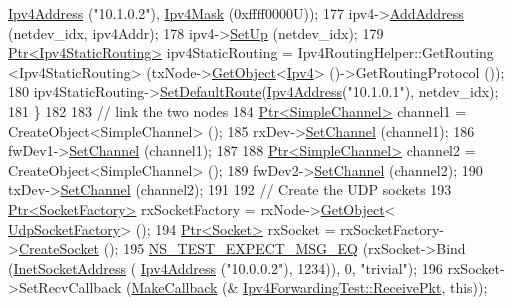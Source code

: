 \begin{DoxyCode}
      \hyperlink{classns3_1_1Ipv4Address}{Ipv4Address} (\textcolor{stringliteral}{"10.1.0.2"}), \hyperlink{classns3_1_1Ipv4Mask}{Ipv4Mask} (0xffff0000U));
177     ipv4->\hyperlink{classns3_1_1Ipv4_ad203526cae6a4b86f1bb89e44d2b62f7}{AddAddress} (netdev\_idx, ipv4Addr);
178     ipv4->\hyperlink{classns3_1_1Ipv4_a71b2f8acca4923aef907b50b3196bf23}{SetUp} (netdev\_idx);
179     \hyperlink{classns3_1_1Ptr}{Ptr<Ipv4StaticRouting>} ipv4StaticRouting = Ipv4RoutingHelper::GetRouting
       <Ipv4StaticRouting> (txNode->\hyperlink{classns3_1_1Object_a13e18c00017096c8381eb651d5bd0783}{GetObject}<\hyperlink{classns3_1_1Ipv4}{Ipv4}> ()->GetRoutingProtocol ());
180     ipv4StaticRouting->\hyperlink{classns3_1_1Ipv4StaticRouting_aee30fa3246c2b42f122dabdff2725331}{SetDefaultRoute}(\hyperlink{classns3_1_1Ipv4Address}{Ipv4Address}(\textcolor{stringliteral}{"10.1.0.1"}), netdev\_idx);
181   \}
182 
183   \textcolor{comment}{// link the two nodes}
184   \hyperlink{classns3_1_1Ptr}{Ptr<SimpleChannel>} channel1 = CreateObject<SimpleChannel> ();
185   rxDev->\hyperlink{classns3_1_1SimpleNetDevice_af9e9828ad584b5ba538f18f645f162e0}{SetChannel} (channel1);
186   fwDev1->\hyperlink{classns3_1_1SimpleNetDevice_af9e9828ad584b5ba538f18f645f162e0}{SetChannel} (channel1);
187 
188   \hyperlink{classns3_1_1Ptr}{Ptr<SimpleChannel>} channel2 = CreateObject<SimpleChannel> ();
189   fwDev2->\hyperlink{classns3_1_1SimpleNetDevice_af9e9828ad584b5ba538f18f645f162e0}{SetChannel} (channel2);
190   txDev->\hyperlink{classns3_1_1SimpleNetDevice_af9e9828ad584b5ba538f18f645f162e0}{SetChannel} (channel2);
191 
192   \textcolor{comment}{// Create the UDP sockets}
193   \hyperlink{classns3_1_1Ptr}{Ptr<SocketFactory>} rxSocketFactory = rxNode->\hyperlink{classns3_1_1Object_a13e18c00017096c8381eb651d5bd0783}{GetObject}<
      \hyperlink{classns3_1_1UdpSocketFactory}{UdpSocketFactory}> ();
194   \hyperlink{classns3_1_1Ptr}{Ptr<Socket>} rxSocket = rxSocketFactory->\hyperlink{classns3_1_1SocketFactory_a97351e6e7860503a4912042530449f62}{CreateSocket} ();
195   \hyperlink{group__testing_ga7304ba46a28d8cf08dfdfd6499cf7068}{NS\_TEST\_EXPECT\_MSG\_EQ} (rxSocket->Bind (\hyperlink{classns3_1_1InetSocketAddress}{InetSocketAddress} (
      \hyperlink{classns3_1_1Ipv4Address}{Ipv4Address} (\textcolor{stringliteral}{"10.0.0.2"}), 1234)), 0, \textcolor{stringliteral}{"trivial"});
196   rxSocket->SetRecvCallback (\hyperlink{group__makecallbackmemptr_ga9376283685aa99d204048d6a4b7610a4}{MakeCallback} (&
      \hyperlink{classIpv4ForwardingTest_a1dd225798eccb21f72d5f2e64765e89b}{Ipv4ForwardingTest::ReceivePkt}, \textcolor{keyword}{this}));

\end{DoxyCode}
